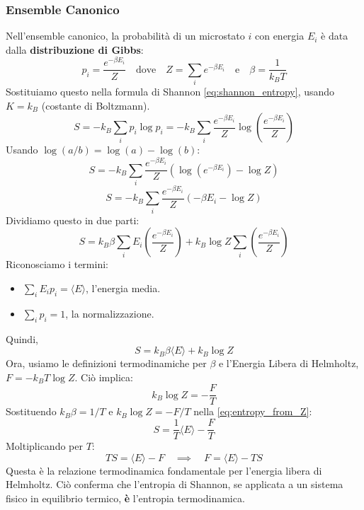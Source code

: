 \begin{enumerate}
\subsubsection{Ensemble Canonico}
Nell'ensemble canonico, la probabilità di un microstato $i$ con energia $E_i$ è data dalla \textbf{distribuzione di Gibbs}:
\begin{equation}
    p_i = \frac{e^{-\beta E_i}}{Z} \quad \text{dove} \quad Z = \sum_i e^{-\beta E_i} \quad \text{e} \quad \beta = \frac{1}{k_B T}
    \label{eq:gibbs_dist}
\end{equation}
Sostituiamo questo nella formula di Shannon \eqref{eq:shannon_entropy}, usando $K = k_B$ (costante di Boltzmann).
$$ S = -k_B \sum_i p_i \log p_i = -k_B \sum_i \frac{e^{-\beta E_i}}{Z} \log \left( \frac{e^{-\beta E_i}}{Z} \right) $$
Usando $\log(a/b) = \log(a) - \log(b)$:
$$ S = -k_B \sum_i \frac{e^{-\beta E_i}}{Z} \left( \log(e^{-\beta E_i}) - \log Z \right) $$
$$ S = -k_B \sum_i \frac{e^{-\beta E_i}}{Z} \left( -\beta E_i - \log Z \right) $$
Dividiamo questo in due parti:
$$ S = k_B \beta \sum_i E_i \left(\frac{e^{-\beta E_i}}{Z}\right) + k_B \log Z \sum_i \left(\frac{e^{-\beta E_i}}{Z}\right) $$
Riconosciamo i termini:
\begin{itemize}
    \item $\sum_i E_i p_i = \langle E \rangle$, l'energia media.
    \item $\sum_i p_i = 1$, la normalizzazione.
\end{itemize}
Quindi,
\begin{equation}
    S = k_B \beta \langle E \rangle + k_B \log Z
    \label{eq:entropy_from_Z}
\end{equation}
Ora, usiamo le definizioni termodinamiche per $\beta$ e l'Energia Libera di Helmholtz, $F = -k_B T \log Z$. Ciò implica:
$$ k_B \log Z = -\frac{F}{T} $$
Sostituendo $k_B \beta = 1/T$ e $k_B \log Z = -F/T$ nella \eqref{eq:entropy_from_Z}:
$$ S = \frac{1}{T} \langle E \rangle - \frac{F}{T} $$
Moltiplicando per $T$:
$$ TS = \langle E \rangle - F \quad \implies \quad F = \langle E \rangle - TS $$
Questa è la relazione termodinamica fondamentale per l'energia libera di Helmholtz. Ciò conferma che l'entropia di Shannon, se applicata a un sistema fisico in equilibrio termico, \textbf{è} l'entropia termodinamica.


\end{enumerate}
